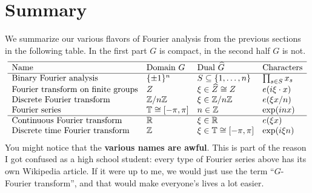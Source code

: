 \section{Summary}
We summarize our various flavors of Fourier analysis
from the previous sections in the following table.
In the first part $G$ is compact,
in the second half $G$ is not.
\[
	\begin{array}{llll}
		\hline
		\text{Name} & \text{Domain }G & \text{Dual }\widehat G 
			& \text{Characters} \\ \hline
		\text{Binary Fourier analysis} & \{\pm1\}^n
			& S \subseteq \left\{ 1, \dots, n \right\}
			& \prod_{s \in S} x_s \\
		\text{Fourier transform on finite groups} & Z
			& \xi \in \widehat Z \cong Z & e( i \xi \cdot x) \\
		\text{Discrete Fourier transform} & \mathbb Z/n\mathbb Z & \xi \in \mathbb Z/n\mathbb Z
			& e(\xi x / n) \\
		\text{Fourier series} & \mathbb T \cong [-\pi, \pi]  & n \in \mathbb Z
			& \exp(inx) \\ \hline
		\text{Continuous Fourier transform} & \mathbb R & \xi \in \mathbb R
		 	& e(\xi x) \\
		\text{Discrete time Fourier transform} & \mathbb Z & \xi \in \mathbb T \cong [-\pi, \pi]
		 	& \exp(i \xi n) \\
	\end{array}
\]
You might notice that the \textbf{various names are awful}.
This is part of the reason I got confused as a high school student:
every type of Fourier series above has its own Wikipedia article.
If it were up to me, we would just use the term ``$G$-Fourier transform'',
and that would make everyone's lives a lot easier.

\section{\problemhead}

